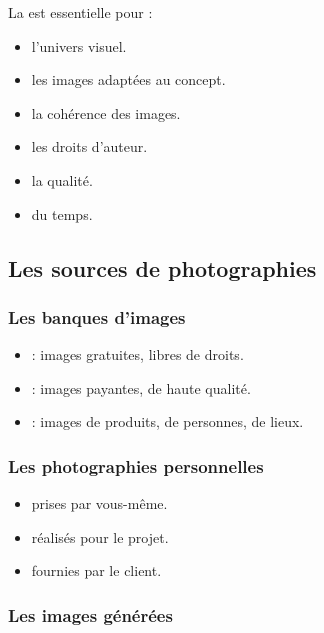 La  est essentielle pour :

\begin{itemize}
    \item {} l'univers visuel.
    \item {} les images adaptées au concept.
    \item {} la cohérence des images.
    \item {} les droits d'auteur.
    \item {} la qualité.
    \item {} du temps.
\end{itemize}

\subsection{Les sources de photographies}

\subsubsection{Les banques d'images}

\begin{itemize}
    \item {} : images gratuites, libres de droits.
    \item {} : images payantes, de haute qualité.
    \item {} : images de produits, de personnes, de lieux.
\end{itemize}

\subsubsection{Les photographies personnelles}

\begin{itemize}
    \item {} prises par vous-même.
    \item {} réalisés pour le projet.
    \item {} fournies par le client.
\end{itemize}

\subsubsection{Les images générées}

